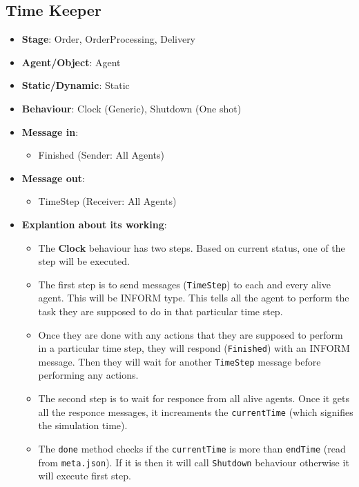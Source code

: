 \documentclass[12pt]{article}
\begin{document}
\subsection{Time Keeper}%
\label{sub:time_keeper}
\begin{itemize}
    \item \textbf{Stage}: Order, OrderProcessing, Delivery
    \item \textbf{Agent/Object}: Agent
    \item \textbf{Static/Dynamic}: Static
    \item \textbf{Behaviour}: Clock (Generic), Shutdown (One shot)
    \item \textbf{Message in}:
        \begin{itemize}
            \item Finished (Sender: All Agents)
        \end{itemize}
    \item \textbf{Message out}:
        \begin{itemize}
            \item TimeStep (Receiver: All Agents)
        \end{itemize}
    \item \textbf{Explantion about its working}:
        \begin{itemize}
            \item The \textbf{Clock} behaviour has two steps. Based on current status, one of the step will be executed.
            \item The first step is to send messages (\texttt{TimeStep}) to each and every alive agent. This will be INFORM type. This tells all the agent to perform the task they are supposed to do in that particular time step.
            \item Once they are done with any actions that they are supposed to perform in a particular time step, they will respond (\texttt{Finished}) with an INFORM message. Then they will wait for another \texttt{TimeStep} message before performing any actions.
            \item The second step is to wait for responce from all alive agents. Once it gets all the responce messages, it increaments the \texttt{currentTime} (which signifies the simulation time). 
            \item The \texttt{done} method checks if the \texttt{currentTime} is more than \texttt{endTime} (read from \texttt{meta.json}). If it is then it will call \texttt{Shutdown} behaviour otherwise it will execute first step.
        \end{itemize}
\end{itemize}
\end{document}
